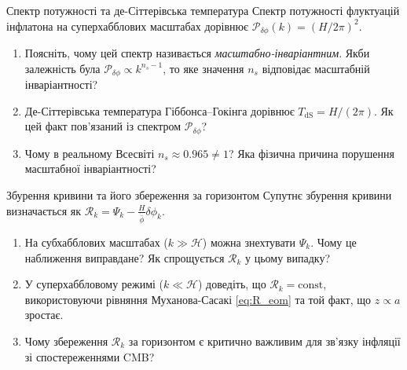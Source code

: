 \begin{problem}{Спектр потужності та де-Сіттерівська температура}
Спектр потужності флуктуацій інфлатона на суперхабблових масштабах дорівнює
$\mathcal{P}_{\delta\phi}(k) = (H/2\pi)^2$.

\begin{enumerate}
    \item Поясніть, чому цей спектр називається \emph{масштабно-інваріантним}.
          Якби залежність була $\mathcal{P}_{\delta\phi} \propto k^{n_s-1}$, то яке
          значення $n_s$ відповідає масштабній інваріантності?
    \item Де-Сіттерівська температура Гіббонса--Гокінга дорівнює $T_{\mathrm{dS}} = H/(2\pi)$.
          Як цей факт пов'язаний із спектром $\mathcal{P}_{\delta\phi}$?
    \item Чому в реальному Всесвіті $n_s \approx 0.965 \neq 1$? Яка фізична причина
          порушення масштабної інваріантності?
\end{enumerate}
\end{problem}


\begin{problem}{Збурення кривини та його збереження за горизонтом}
Супутнє збурення кривини визначається як $\mathcal{R}_k = \Psi_k - \frac{H}{\dot{\bar\phi}}\delta\phi_k$.

\begin{enumerate}
    \item На субхабблових масштабах ($k \gg \mathcal{H}$) можна знехтувати $\Psi_k$.
          Чому це наближення виправдане? Як спрощується $\mathcal{R}_k$ у цьому випадку?
    \item У суперхаббловому режимі ($k \ll \mathcal{H}$) доведіть, що $\mathcal{R}_k = \mathrm{const}$,
          використовуючи рівняння Муханова-Сасакі \eqref{eq:R_eom} та той факт, що $z \propto a$ зростає.
    \item Чому збереження $\mathcal{R}_k$ за горизонтом є критично важливим для
          зв'язку інфляції зі спостереженнями CMB?
\end{enumerate}
\end{problem}


